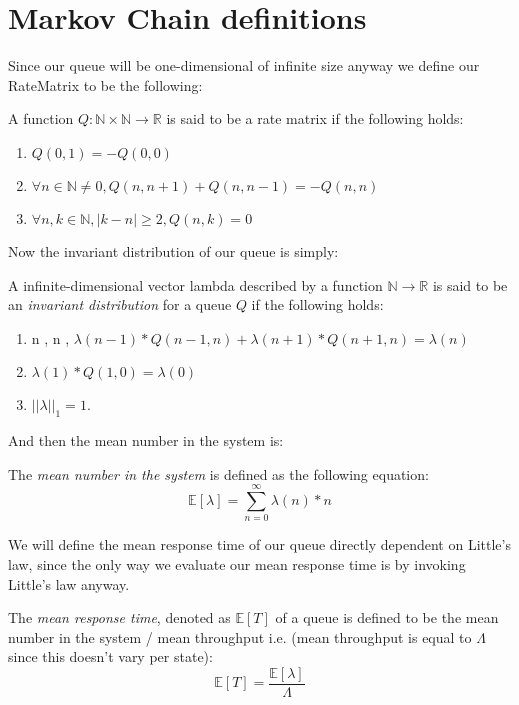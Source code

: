 \section{Markov Chain definitions}

Since our queue will be one-dimensional of infinite size anyway we define our RateMatrix to be the following:
\begin{definition}\label{def:RateMatrix}\leanok
    A function $Q \colon \mathbb{N} \times \mathbb{N} \to \mathbb{R}$ is said to be a rate matrix
    if the following holds:
    \begin{enumerate}
      \item $Q(0,1) = -Q(0,0)$
      \item $\forall n \in \mathbb{N} \neq 0, Q(n, n+1) + Q(n, n-1) = -Q(n,n)$
      \item $\forall n, k \in \mathbb{N}, |k-n| \geq 2, Q(n,k) = 0$
    \end{enumerate}
\end{definition}

Now the invariant distribution of our queue is simply:
\begin{definition}\label{def:InvariantDistribution}\leanok
    A infinite-dimensional vector lambda described by a function $\mathbb{N} \to \mathbb{R}$ is said
    to be an \textit{invariant distribution} for a queue $Q$ if the following holds:\
    \begin{enumerate}
        \item \forall n \in {}, n , $\lambda(n-1) * Q(n-1,n) + \lambda(n+1) * Q(n+1,n) = \lambda(n)$
        \item $\lambda(1) * Q(1,0) = \lambda(0)$
        \item $||\lambda||_1 = 1$.
    \end{enumerate}
\end{definition}

And then the mean number in the system is:
\begin{definition}\label{def:MeanLambda}
    The \textit{mean number in the system} is defined as the following equation:
    $$\mathbb{E}[\lambda] = \sum_{n=0}^\infty \lambda(n)*n$$
\end{definition}

We will define the mean response time of our queue directly dependent on Little's law, since the only
way we evaluate our mean response time is by invoking Little's law anyway.
\begin{definition}\label{def:MeanResponseTime}\uses{def:MeanLambda}\leanok
    The \textit{mean response time}, denoted as $\mathbb{E}[T]$ of a queue is defined to be the mean
    number in the system / mean throughput i.e. (mean throughput is equal to $\Lambda$ since this doesn't vary
    per state):
    $$\mathbb{E}[T] = \frac{\mathbb{E}[\lambda]}{\Lambda}$$
\end{definition}

